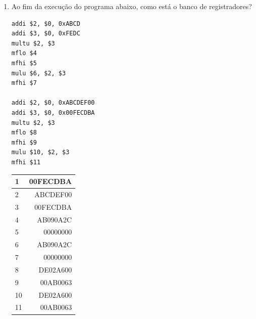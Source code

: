 \documentclass{article}
\begin{document}
\begin{enumerate}
\begin{center}
    \begin{minipage}{0.35\textwidth}
        \begin{lstlisting}[frame=single]
addi $sp, $0, 0x7FFFEFFC
j main

recursive:
lw $t0, 0($sp)
addi $sp, $sp, 4

bne $t0, $0, else
addi $sp, $sp, -4
sw $t0, 0($sp)
jr $ra

else:
addi $t0, $t0, -1
addi $sp, $sp, -8
sw $t0, 0($sp)
sw $ra, 4($sp)
jal recursive
lw $t0, 0($sp)
lw $ra, 4($sp)
addi $sp, $sp, 8
addi $t0, $t0, 1
addi $sp, $sp, -4
sw $t0, 0($sp)
jr $ra

main:
addi $s0, $0, 0xABCD
addi $sp, $sp, -4
sw $s0, 0($sp)
jal recursive
lw $s1, 0($sp)
addi $sp, $sp, 4
        \end{lstlisting}
    \end{minipage}
\end{center}

\url{https://github.com/Eduardo-bat/AOC_2024/blob/main/recursive.asm}

\pagebreak

\item Ao fim da execução do programa abaixo, como está o banco de registradores?

\begin{center}
    \begin{minipage}{0.45\textwidth}
        \begin{lstlisting}[frame=single]
addi $2, $0, 0xABCD
addi $3, $0, 0xFEDC
multu $2, $3
mflo $4
mfhi $5
mulu $6, $2, $3
mfhi $7

addi $2, $0, 0xABCDEF00
addi $3, $0, 0x00FECDBA
multu $2, $3
mflo $8
mfhi $9
mulu $10, $2, $3
mfhi $11
        \end{lstlisting}

\begin{table}[H]
    \begin{tabular}{|l|r|}
    \hline
    1  & 00FECDBA \\ \hline
    2  & ABCDEF00 \\ \hline
    3  & 00FECDBA \\ \hline
    4  & AB090A2C \\ \hline
    5  & 00000000 \\ \hline
    6  & AB090A2C \\ \hline
    7  & 00000000 \\ \hline
    8  & DE02A600 \\ \hline
    9  & 00AB0063 \\ \hline
    10 & DE02A600 \\ \hline
    11 & 00AB0063 \\ \hline
    \end{tabular}
\end{table}
\end{minipage}
\end{center}


\end{enumerate}
\end{document}
